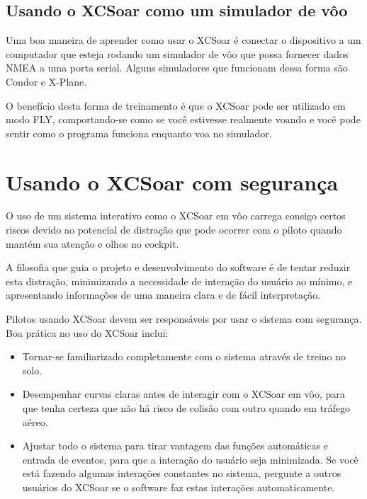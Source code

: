 \subsection*{Usando o XCSoar como um simulador de vôo}
Uma boa maneira de aprender como usar o XCSoar é conectar o dispositivo a um computador que esteja rodando um simulador de vôo que possa fornecer dados NMEA a uma porta serial.  Alguns simuladores que funcionam dessa forma são Condor e X-Plane. 

O benefício desta forma de treinamento é que o XCSoar pode ser utilizado em modo FLY, comportando-se como se você estivesse realmente voando e você pode sentir como o programa funciona enquanto voa no simulador.

\section{Usando o XCSoar com segurança}\label{sec:usingxcsoarsafely}\label{conf:usingxcsoarsafely}
O uso de um sistema interativo como o XCSoar em vôo carrega consigo certos riscos devido ao potencial de distração que pode ocorrer com o piloto quando mantém sua atenção e olhos no cockpit.

A filosofia que guia o projeto e desenvolvimento do software é de tentar reduzir esta distração, minimizando a necessidade de interação do usuário ao mínimo, e apresentando informações de uma maneira clara e de fácil interpretação.

Pilotos usando XCSoar devem ser responsáveis por usar o sistema com segurança.  Boa prática no uso do XCSoar inclui:

\begin{itemize}
\item Tornar-se familiarizado completamente com o sistema através de treino no solo.
\item Desempenhar curvas claras antes de interagir com o XCSoar em vôo, para que tenha certeza que não há risco de colisão com outro quando em tráfego aéreo.
\item Ajustar todo o sistema para tirar vantagem das funções automáticas e entrada de eventos, para que a interação do usuário seja minimizada.  Se você está fazendo algumas interações constantes no sistema, pergunte a outros usuários do XCSoar se o software faz estas interações automaticamente.
 

\end{itemize}
